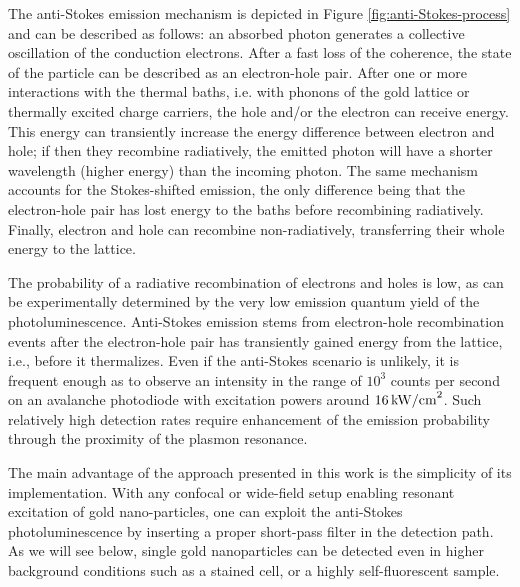 The anti-Stokes emission mechanism\cite{He2015} is depicted in Figure
\ref{fig:anti-Stokes-process} and can be described as follows: an absorbed
photon generates a collective oscillation of the conduction electrons. After a
fast loss of the coherence\cite{Sonnichsen2002}, the state of the particle can
be described as an electron-hole pair. After one or more interactions with the thermal
baths, i.e. with phonons of the gold lattice\cite{Lin2008} or thermally
excited charge carriers\cite{Sun1994}, the hole and/or the electron can
receive energy. This energy can transiently increase the energy difference between electron and
hole; if then they recombine radiatively, the emitted photon will have a shorter
wavelength (higher energy) than the incoming photon\cite{Huang2014}. The same
mechanism accounts for the Stokes-shifted emission, the only difference being
that the electron-hole pair has lost energy to the baths before recombining
radiatively. Finally, electron and hole can recombine
non-radiatively, transferring their whole energy to the lattice. 

\begin{sloppypar}
The probability of a radiative recombination of electrons and holes is low, as
can be experimentally determined by the very low emission quantum yield of the
photoluminescence\cite{Yorulmaz2012,Rao2015,Sonnichsen2002}. Anti-Stokes
emission stems from electron-hole recombination events after the electron-hole
pair has transiently gained energy from the lattice, i.e., before it
thermalizes. Even if the anti-Stokes scenario is unlikely, it is frequent enough
as to observe an intensity in the range of $10^3$ counts per second on an
avalanche photodiode with excitation powers around $16\,\textrm{kW/cm}^2$. Such relatively
high detection rates require enhancement of the emission probability through the
proximity of the plasmon resonance\cite{Neupane2013}.
\end{sloppypar}

The main advantage of the approach presented in this work is the simplicity of
its implementation. With any confocal or wide-field setup enabling resonant
excitation of gold nano-particles, one can exploit the anti-Stokes
photoluminescence by inserting a proper short-pass filter in the detection path.
As we will see below, single gold nanoparticles can be detected even in higher
background conditions such as a stained cell, or a highly self-fluorescent
sample.

